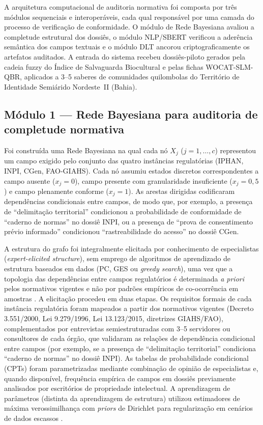 \documentclass[preprint,12pt,authoryear]{elsarticle}
\begin{document}
A arquitetura computacional de auditoria normativa foi composta por três módulos sequenciais e interoperáveis, cada qual responsável por uma camada do processo de verificação de conformidade. O módulo de Rede Bayesiana avaliou a completude estrutural dos dossiês, o módulo NLP/SBERT verificou a aderência semântica dos campos textuais e o módulo DLT ancorou criptograficamente os artefatos auditados. A entrada do sistema recebeu dossiês-piloto gerados pela cadeia fuzzy do Índice de Salvaguarda Biocultural e pelas fichas WOCAT-SLM-QBR, aplicados a 3--5 saberes de comunidades quilombolas do Território de Identidade Semiárido Nordeste~II (Bahia).

\subsection{Módulo 1 --- Rede Bayesiana para auditoria de completude normativa}
\label{subsec:bayesnet_cap5}

Foi construída uma Rede Bayesiana na qual cada nó $X_j$ ($j = 1, \ldots, c$) representou um campo exigido pelo conjunto das quatro instâncias regulatórias (IPHAN, INPI, CGen, FAO-GIAHS). Cada nó assumiu estados discretos correspondentes a campo ausente ($x_j = 0$), campo presente com granularidade insuficiente ($x_j = 0{,}5$) e campo plenamente conforme ($x_j = 1$). As arestas dirigidas codificaram dependências condicionais entre campos, de modo que, por exemplo, a presença de ``delimitação territorial'' condicionou a probabilidade de conformidade de ``caderno de normas'' no dossiê INPI, ou a presença de ``prova de consentimento prévio informado'' condicionou ``rastreabilidade do acesso'' no dossiê CGen.

A estrutura do grafo foi integralmente elicitada por conhecimento de especialistas (\textit{expert-elicited structure}), sem emprego de algoritmos de aprendizado de estrutura baseados em dados (PC, GES ou \textit{greedy search}), uma vez que a topologia das dependências entre campos regulatórios é determinada \textit{a priori} pelos normativos vigentes e não por padrões empíricos de co-ocorrência em amostras \citep{Pearl2009}. A elicitação procedeu em duas etapas. Os requisitos formais de cada instância regulatória foram mapeados a partir dos normativos vigentes (Decreto 3.551/2000, Lei 9.279/1996, Lei 13.123/2015, diretrizes GIAHS/FAO), complementados por entrevistas semiestruturadas com 3--5 servidores ou consultores de cada órgão, que validaram as relações de dependência condicional entre campos (por exemplo, se a presença de ``delimitação territorial'' condiciona ``caderno de normas'' no dossiê INPI). As tabelas de probabilidade condicional (CPTs) foram parametrizadas mediante combinação de opinião de especialistas e, quando disponível, frequência empírica de campos em dossiês previamente analisados por escritórios de propriedade intelectual. A aprendizagem de parâmetros (distinta da aprendizagem de estrutura) utilizou estimadores de máxima verossimilhança com \textit{priors} de Dirichlet para regularização em cenários de dados escassos \citep{Koller2009}.
\end{document}
